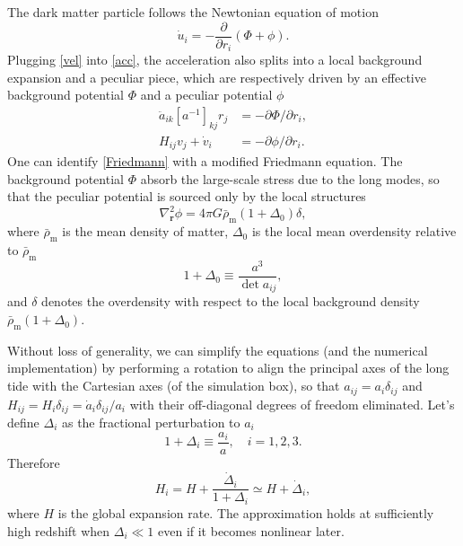 \documentclass[a4paper,11pt]{article}
\newcommand{\vr}{{\bm r}}
\newcommand{\rhobarm}{{\bar\rho_\mathrm{m}}}
\begin{document}
The dark matter particle follows the Newtonian equation of motion
\begin{equation}
    \dot u_i = - \frac{\partial}{\partial r_i} (\Phi + \phi).
    \label{acc}
\end{equation}
Plugging \eqref{vel} into \eqref{acc}, the acceleration also splits into
a local background expansion and a peculiar piece,
which are respectively driven by an effective background potential $\Phi$ and
a peculiar potential $\phi$
\begin{align}
    \ddot a_{ik} [a^{-1}]_{kj} r_j &= - \partial\Phi / \partial r_i,
    \label{Friedmann} \\
    H_{ij} v_j + \dot v_i &= - \partial\phi / \partial r_i.
    \label{pecvel}
\end{align}
One can identify \eqref{Friedmann} with a modified Friedmann equation.
The background potential $\Phi$ absorb the large-scale stress due to the long
modes, so that the peculiar potential is sourced only by the local structures
\begin{equation}
    \nabla_\vr^2 \phi = 4\pi G \rhobarm (1 + \Delta_0) \delta,
    \label{poisson}
\end{equation}
where $\rhobarm$ is the mean density of matter, $\Delta_0$ is the
local mean overdensity relative to $\rhobarm$
\begin{equation}
    1 + \Delta_0 \equiv \frac{a^3}{\det a_{ij}},
    \label{eq:D0=det}
\end{equation}
and $\delta$ denotes the overdensity with respect to the local background
density $\rhobarm (1 + \Delta_0)$.

Without loss of generality, we can simplify the equations (and the numerical
implementation) by performing a rotation to align the principal axes of the
long tide with the Cartesian axes (of the simulation box), so that $a_{ij} =
a_i \delta_{ij}$ and $H_{ij} = H_i \delta_{ij} = \dot a_i \delta_{ij} / a_i$
with their off-diagonal degrees of freedom eliminated.
Let's define $\Delta_i$ as the fractional perturbation to $a_i$
\begin{equation}
    1 + \Delta_i \equiv \frac{a_i} a, \quad i = 1, 2, 3.
\end{equation}
Therefore
\begin{equation}
    H_i = H + \frac{\dot{\Delta}_i}{1+\Delta_i}
    \simeq H +\dot{\Delta}_i,
    \label{eq:Hi}
\end{equation}
where $H$ is the global expansion rate.
The approximation holds at sufficiently high redshift when $\Delta_i \ll 1$
even if it becomes nonlinear later.
\end{document}
